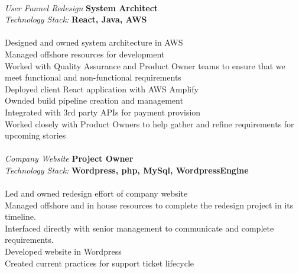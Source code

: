 \documentclass[margin,line]{resume}
\begin{document}
\begin{resume}
    \textbf{\listing} \vspace{2mm}\\\vspace{1mm}%
    \textsl{User Funnel Redesign}  \hfill \textbf{System Architect}\\
    \textsl{Technology Stack:‎} \hfill \textbf{React, Java, AWS}\\\\
    Designed and owned system architecture in AWS\\
    Managed offshore resources for development\\
    Worked with Quality Assurance and Product Owner teams to ensure that we meet functional and non-functional requirements\\
    Deployed client React application with AWS Amplify\\
    Ownded build pipeline creation and management\\
    Integrated with 3rd party APIs for payment provision\\ 
    Worked closely with Product Owners to help gather and refine requirements for upcoming stories\\
    \textbf{\listing} \vspace{0mm}\\\vspace{1mm}%
    \textsl{Company Website} \hfill \textbf{Project Owner}\\
    \textsl{Technology Stack:‎} \hfill \textbf{Wordpress, php, MySql, WordpressEngine}\\\\
    Led and owned redesign effort of company website\\
    Managed offshore and in house resources to complete the redesign project in its timeline.\\
    Interfaced directly with senior management to communicate and complete requirements.\\
    Developed website in Wordpress\\
    Created current practices for support ticket lifecycle\\

\sectionline



\end{resume}
\end{document}
